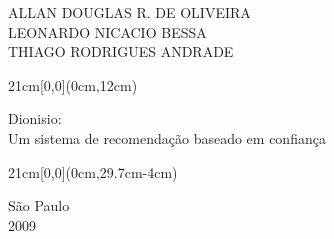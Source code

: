 \begin{center}
  {\large ALLAN DOUGLAS R. DE OLIVEIRA \\
    LEONARDO NICACIO BESSA \\
    THIAGO RODRIGUES ANDRADE}
\end{center}

\begin{textblock*}{21cm}[0,0](0cm,12cm)
  \begin{center}
    {\LARGE Dionisio:\\ Um sistema de recomendação baseado em confiança }
  \end{center}
\end{textblock*}


\begin{textblock*}{21cm}[0,0](0cm,29.7cm-4cm)
  \begin{center}
    {\large São Paulo \\ 2009 }
  \end{center}
\end{textblock*}
